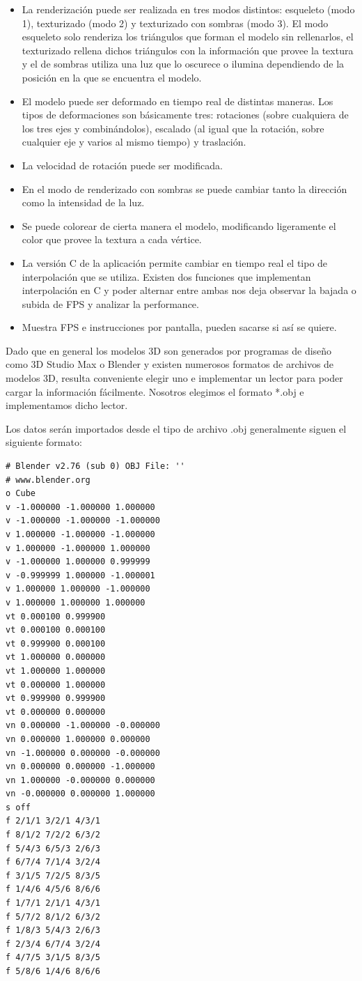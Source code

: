 \documentclass[a4paper]{article}
\newcounter{col}
\begin{document}
\begin{itemize}
\item La renderización puede ser realizada en tres modos distintos: esqueleto (modo 1), texturizado (modo 2) y texturizado con sombras (modo 3). El modo esqueleto solo renderiza los triángulos que forman el modelo sin rellenarlos, el texturizado rellena dichos triángulos con la información que provee la textura y el de sombras utiliza una luz que lo oscurece o ilumina dependiendo de la posición en la que se encuentra el modelo. 
\item El modelo puede ser deformado en tiempo real de distintas maneras. Los tipos de deformaciones son básicamente tres: rotaciones (sobre cualquiera de los tres ejes y combinándolos), escalado (al igual que la rotación, sobre cualquier eje y varios al mismo tiempo) y traslación. 
\item La velocidad de rotación puede ser modificada.
\item En el modo de renderizado con sombras se puede cambiar tanto la dirección como la intensidad de la luz.
\item Se puede colorear de cierta manera el modelo, modificando ligeramente el color que provee la textura a cada vértice.
\item La versión C de la aplicación permite cambiar en tiempo real el tipo de interpolación que se utiliza. Existen dos funciones que implementan interpolación en C y poder alternar entre ambas nos deja observar la bajada o subida de FPS y analizar la performance.
\item Muestra FPS e instrucciones por pantalla, pueden sacarse si así se quiere.
\end{itemize} 

\par Dado que en general los modelos 3D son generados por programas de diseño como 3D Studio Max o Blender y existen numerosos formatos de archivos de modelos 3D, resulta conveniente elegir uno e implementar un lector para poder cargar la información fácilmente. Nosotros elegimos el formato *.obj e implementamos dicho lector.

Los datos serán importados desde el tipo de archivo .obj generalmente siguen el siguiente formato:  

\begin{verbatim}
# Blender v2.76 (sub 0) OBJ File: ''
# www.blender.org
o Cube
v -1.000000 -1.000000 1.000000
v -1.000000 -1.000000 -1.000000
v 1.000000 -1.000000 -1.000000
v 1.000000 -1.000000 1.000000
v -1.000000 1.000000 0.999999
v -0.999999 1.000000 -1.000001
v 1.000000 1.000000 -1.000000
v 1.000000 1.000000 1.000000
vt 0.000100 0.999900
vt 0.000100 0.000100
vt 0.999900 0.000100
vt 1.000000 0.000000
vt 1.000000 1.000000
vt 0.000000 1.000000
vt 0.999900 0.999900
vt 0.000000 0.000000
vn 0.000000 -1.000000 -0.000000
vn 0.000000 1.000000 0.000000
vn -1.000000 0.000000 -0.000000
vn 0.000000 0.000000 -1.000000
vn 1.000000 -0.000000 0.000000
vn -0.000000 0.000000 1.000000
s off
f 2/1/1 3/2/1 4/3/1
f 8/1/2 7/2/2 6/3/2
f 5/4/3 6/5/3 2/6/3
f 6/7/4 7/1/4 3/2/4
f 3/1/5 7/2/5 8/3/5
f 1/4/6 4/5/6 8/6/6
f 1/7/1 2/1/1 4/3/1
f 5/7/2 8/1/2 6/3/2
f 1/8/3 5/4/3 2/6/3
f 2/3/4 6/7/4 3/2/4
f 4/7/5 3/1/5 8/3/5
f 5/8/6 1/4/6 8/6/6
\end{verbatim} 
\end{document}
